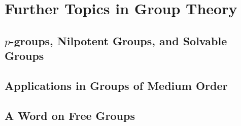 \chapter{Further Topics in Group Theory}

\section{$p$-groups, Nilpotent Groups, and Solvable Groups}

\section{Applications in Groups of Medium Order}

\section{A Word on Free Groups}